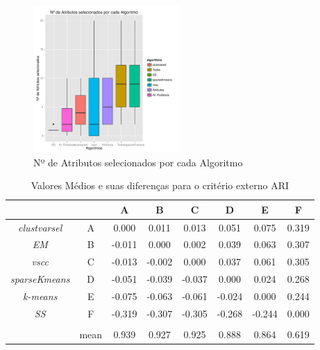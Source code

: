 \documentclass{acm_proc_article-sp}
\begin{document}
\begin{figure}
    \centering
    \includegraphics[width=0.5\textwidth]{subset}
    \caption{Nº de Atributos selecionados por cada Algoritmo}
    \label{fig:subsets}
\end{figure}

\begin{table}
    \centering
    \begin{tabular}{cccccccc}
        \toprule
                  & & A & B & C & D & E & F \\
        \midrule
\textit{clustvarsel}     & A &  0.000 & 0.011 & 0.013 & \cellcolor{gray}0.051 &\cellcolor{gray} 0.075 &\cellcolor{gray} 0.319 \\
\textit{EM}              & B & -0.011 & 0.000 & 0.002 & 0.039 &\cellcolor{gray} 0.063 &\cellcolor{gray} 0.307 \\
\textit{vscc}            & C & -0.013 &-0.002 & 0.000 &\cellcolor{gray} 0.037 &\cellcolor{gray} 0.061 &\cellcolor{gray} 0.305 \\
\textit{sparseKmeans}    & D & \cellcolor{gray}-0.051 &-0.039 &\cellcolor{gray}-0.037 & 0.000 & 0.024 &\cellcolor{gray} 0.268 \\
\textit{k-means}         & E & \cellcolor{gray}-0.075 &\cellcolor{gray}-0.063 &\cellcolor{gray}-0.061 &-0.024 & 0.000 &\cellcolor{gray} 0.244 \\
\textit{SS}              & F & \cellcolor{gray}-0.319 &\cellcolor{gray}-0.307 &\cellcolor{gray}-0.305 &\cellcolor{gray}-0.268 &\cellcolor{gray}-0.244 & 0.000 \\ \\
        \midrule
            & mean  &  0.939 & 0.927 & 0.925 & 0.888 & 0.864 & 0.619 \\
        \bottomrule
    \end{tabular}
    \caption{Valores Médios e suas diferenças para o critério externo ARI}
    \label{tab:ariMeans}
\end{table}
\end{document}
